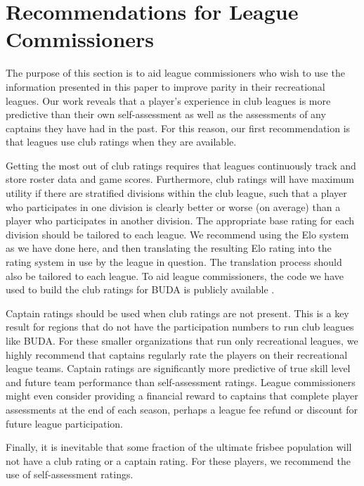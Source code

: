 \section{Recommendations for League Commissioners}\label{sec:recommendations}

The purpose of this section is to aid league commissioners who wish to use the information presented in this paper to improve parity in their recreational leagues. Our work reveals that a player's experience in club leagues is more predictive than their own self-assessment as well as the assessments of any captains they have had in the past. For this reason, our first recommendation is that leagues use club ratings when they are available. 

Getting the most out of club ratings requires that leagues continuously track and store roster data and game scores. Furthermore, club ratings will have maximum utility if there are stratified divisions within the club league, such that a player who participates in one division is clearly better or worse (on average) than a player who participates in another division. The appropriate base rating for each division should be tailored to each league. We recommend using the Elo system as we have done here, and then translating the resulting Elo rating into the rating system in use by the league in question. The translation process should also be tailored to each league. To aid league commissioners, the code we have used to build the club ratings for BUDA is publicly available \cite{shanegit}.

Captain ratings should be used when club ratings are not present. This is a key result for regions that do not have the participation numbers to run club leagues like BUDA. For these smaller organizations that run only recreational leagues, we highly recommend that captains regularly rate the players on their recreational league teams. Captain ratings are significantly more predictive of true skill level and future team performance than self-assessment ratings. League commissioners might even consider providing a financial reward to captains that complete player assessments at the end of each season, perhaps a league fee refund or discount for future league participation. 

Finally, it is inevitable that some fraction of the ultimate frisbee population will not have a club rating or a captain rating. For these players, we recommend the use of self-assessment ratings.